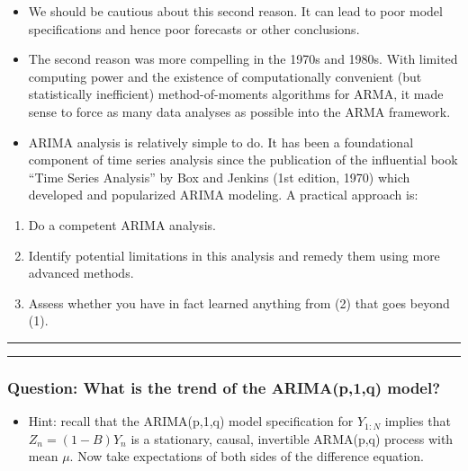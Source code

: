 \documentclass[]{article}
\providecommand{\tightlist}{%
  \setlength{\itemsep}{0pt}\setlength{\parskip}{0pt}}
\begin{document}
\begin{itemize}
\item
  We should be cautious about this second reason. It can lead to poor
  model specifications and hence poor forecasts or other conclusions.
\item
  The second reason was more compelling in the 1970s and 1980s. With
  limited computing power and the existence of computationally
  convenient (but statistically inefficient) method-of-moments
  algorithms for ARMA, it made sense to force as many data analyses as
  possible into the ARMA framework.
\item
  ARIMA analysis is relatively simple to do. It has been a foundational
  component of time series analysis since the publication of the
  influential book ``Time Series Analysis'' by Box and Jenkins (1st
  edition, 1970) which developed and popularized ARIMA modeling. A
  practical approach is:
\end{itemize}

\begin{enumerate}
\def\labelenumi{\arabic{enumi}.}
\item
  Do a competent ARIMA analysis.
\item
  Identify potential limitations in this analysis and remedy them using
  more advanced methods.
\item
  Assess whether you have in fact learned anything from (2) that goes
  beyond (1).
\end{enumerate}

\begin{center}\rule{0.5\linewidth}{\linethickness}\end{center}

\begin{center}\rule{0.5\linewidth}{\linethickness}\end{center}

\subsubsection{Question: What is the trend of the ARIMA(p,1,q)
model?}\label{question-what-is-the-trend-of-the-arimap1q-model}

\begin{itemize}
\tightlist
\item
  Hint: recall that the ARIMA(p,1,q) model specification for \(Y_{1:N}\)
  implies that \(Z_n = (1-B)Y_n\) is a stationary, causal, invertible
  ARMA(p,q) process with mean \(\mu\). Now take expectations of both
  sides of the difference equation.
\end{itemize}
\end{document}
